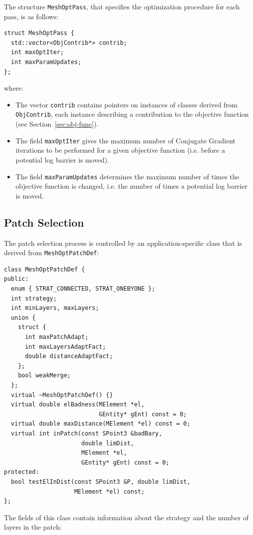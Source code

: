\documentclass[12pt,a4paper,a4wide]{article}
\begin{document}
The structure \texttt{MeshOptPass}, that specifies the optimization
procedure for each pass, is as follows:

\begin{verbatim}
struct MeshOptPass {
  std::vector<ObjContrib*> contrib;
  int maxOptIter;
  int maxParamUpdates;
};
\end{verbatim}

where:

\begin{itemize}
\item The vector \texttt{contrib} contains pointers on instances
of classes derived from \texttt{ObjContrib}, each instance
describing a contribution to the objective function (see
Section~\ref{sec:obj-func}).
\item The field \texttt{maxOptIter} gives the maximum number of
Conjugate Gradient iterations to be performed for a given objective
function (i.e. before a potential log barrier is moved).
\item The field \texttt{maxParamUpdates} determines the maximum
number of times the objective function is changed, i.e. the number
of times a potential log barrier is moved.
\end{itemize}


\subsection{Patch Selection}\label{sec:patch-selec}

The patch selection process is controlled by an application-specific
class that is derived from \texttt{MeshOptPatchDef}:

\begin{verbatim}
class MeshOptPatchDef {
public:
  enum { STRAT_CONNECTED, STRAT_ONEBYONE };
  int strategy;
  int minLayers, maxLayers;
  union {
    struct {
      int maxPatchAdapt;
      int maxLayersAdaptFact;
      double distanceAdaptFact;
    };
    bool weakMerge;
  };
  virtual ~MeshOptPatchDef() {}
  virtual double elBadness(MElement *el,
                           GEntity* gEnt) const = 0;
  virtual double maxDistance(MElement *el) const = 0;
  virtual int inPatch(const SPoint3 &badBary,
                      double limDist,
                      MElement *el,
                      GEntity* gEnt) const = 0;
protected:
  bool testElInDist(const SPoint3 &P, double limDist,
                    MElement *el) const;
};
\end{verbatim}

The fields of this class contain information about the strategy
and the number of layers in the patch:
\end{document}
